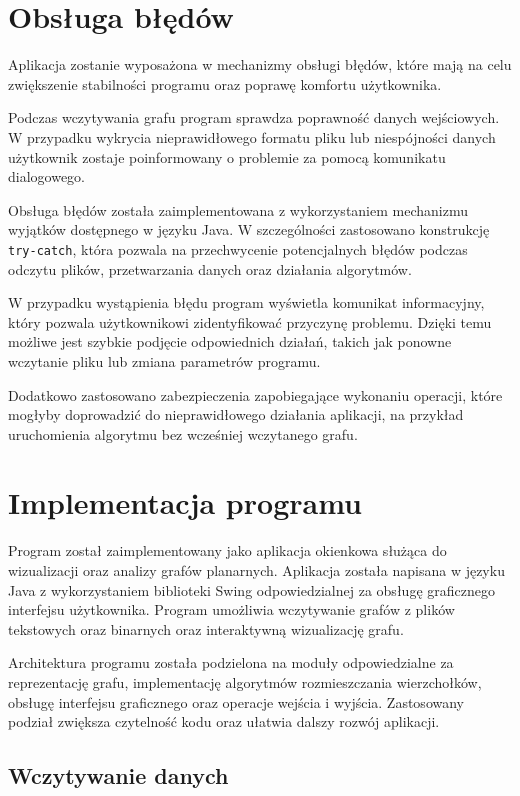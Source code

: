 \documentclass[11pt,a4paper]{article}
\begin{document}
\section{Obsługa błędów}

Aplikacja zostanie wyposażona w mechanizmy obsługi błędów, które mają na celu zwiększenie stabilności programu oraz poprawę komfortu użytkownika.

Podczas wczytywania grafu program sprawdza poprawność danych wejściowych. W przypadku wykrycia nieprawidłowego formatu pliku lub niespójności danych użytkownik zostaje poinformowany o problemie za pomocą komunikatu dialogowego.

Obsługa błędów została zaimplementowana z wykorzystaniem mechanizmu wyjątków dostępnego w języku Java. W szczególności zastosowano konstrukcję \verb|try-catch|, która pozwala na przechwycenie potencjalnych błędów podczas odczytu plików, przetwarzania danych oraz działania algorytmów.

W przypadku wystąpienia błędu program wyświetla komunikat informacyjny, który pozwala użytkownikowi zidentyfikować przyczynę problemu. Dzięki temu możliwe jest szybkie podjęcie odpowiednich działań, takich jak ponowne wczytanie pliku lub zmiana parametrów programu.

Dodatkowo zastosowano zabezpieczenia zapobiegające wykonaniu operacji, które mogłyby doprowadzić do nieprawidłowego działania aplikacji, na przykład uruchomienia algorytmu bez wcześniej wczytanego grafu.

\section{Implementacja programu}

Program został zaimplementowany jako aplikacja okienkowa służąca do wizualizacji oraz analizy grafów planarnych. Aplikacja została napisana w języku Java z wykorzystaniem biblioteki Swing odpowiedzialnej za obsługę graficznego interfejsu użytkownika. Program umożliwia wczytywanie grafów z plików tekstowych oraz binarnych oraz interaktywną wizualizację grafu.

Architektura programu została podzielona na moduły odpowiedzialne za reprezentację grafu, implementację algorytmów rozmieszczania wierzchołków, obsługę interfejsu graficznego oraz operacje wejścia i wyjścia. Zastosowany podział zwiększa czytelność kodu oraz ułatwia dalszy rozwój aplikacji.

\subsection{Wczytywanie danych}
\end{document}
